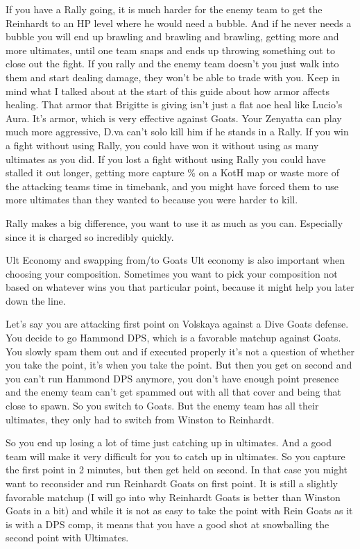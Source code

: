If you have a Rally going, it is much harder for the enemy team to get the Reinhardt to an HP level where he would need a bubble. And if he never needs a bubble you will end up brawling and brawling and brawling, getting more and more ultimates, until one team snaps and ends up throwing something out to close out the fight. If you rally and the enemy team doesn’t you just walk into them and start dealing damage, they won’t be able to trade with you.
Keep in mind what I talked about at the start of this guide about how armor affects healing. That armor that Brigitte is giving isn’t just a flat aoe heal like Lucio’s Aura. It’s armor, which is very effective against Goats. Your Zenyatta can play much more aggressive, D.va can’t solo kill him if he stands in a Rally. If you win a fight without using Rally, you could have won it without using as many ultimates as you did. If you lost a fight without using Rally you could have stalled it out longer, getting more capture \% on a KotH map or waste more of the attacking teams time in timebank, and you might have forced them to use more ultimates than they wanted to because you were harder to kill.

Rally makes a big difference, you want to use it as much as you can. Especially since it is charged so incredibly quickly.

Ult Economy and swapping from/to Goats
Ult economy is also important when choosing your composition. Sometimes you want to pick your composition not based on whatever wins you that particular point, because it might help you later down the line.

Let’s say you are attacking first point on Volskaya against a Dive Goats defense. You decide to go Hammond DPS, which is a favorable matchup against Goats. You slowly spam them out and if executed properly it’s not a question of whether you take the point, it’s when you take the point. But then you get on second and you can’t run Hammond DPS anymore, you don’t have enough point presence and the enemy team can’t get spammed out with all that cover and being that close to spawn. So you switch to Goats. But the enemy team has all their ultimates, they only had to switch from Winston to Reinhardt.

So you end up losing a lot of time just catching up in ultimates. And a good team will make it very difficult for you to catch up in ultimates. So you capture the first point in 2 minutes, but then get held on second. In that case you might want to reconsider and run Reinhardt Goats on first point.
It is still a slightly favorable matchup (I will go into why Reinhardt Goats is better than Winston Goats in a bit) and while it is not as easy to take the point with Rein Goats as it is with a DPS comp, it means that you have a good shot at snowballing the second point with Ultimates.

